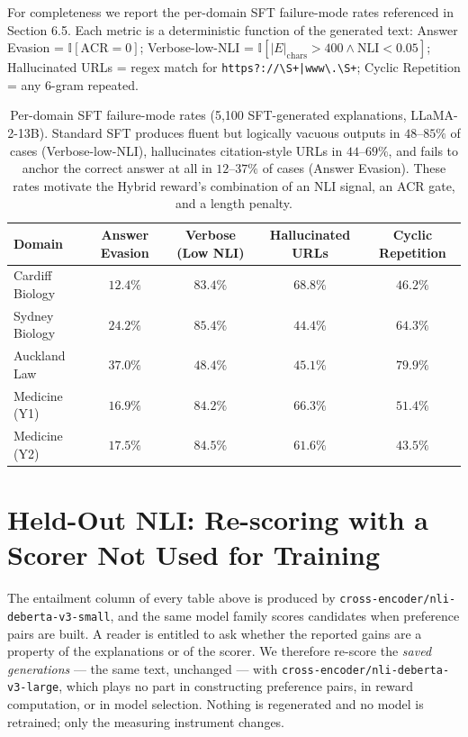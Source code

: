 For completeness we report the per-domain SFT failure-mode rates referenced in Section 6.5. Each metric is a deterministic function of the generated text: Answer Evasion = $\mathbb{I}[\mathrm{ACR}{=}0]$; Verbose-low-NLI = $\mathbb{I}[|E|_\text{chars}{>}400 \land \mathrm{NLI}{<}0.05]$; Hallucinated URLs = regex match for \texttt{https?://\textbackslash S+|www\textbackslash .\textbackslash S+}; Cyclic Repetition = any $6$-gram repeated.

\begin{table}[h]
\centering
\small
\begin{tabular}{l|c|c|c|c}
\toprule
Domain & Answer Evasion & Verbose (Low NLI) & Hallucinated URLs & Cyclic Repetition \\
\midrule
Cardiff Biology & $12.4\%$ & $83.4\%$ & $68.8\%$ & $46.2\%$ \\
Sydney Biology  & $24.2\%$ & $85.4\%$ & $44.4\%$ & $64.3\%$ \\
Auckland Law    & $37.0\%$ & $48.4\%$ & $45.1\%$ & $79.9\%$ \\
Medicine (Y1)   & $16.9\%$ & $84.2\%$ & $66.3\%$ & $51.4\%$ \\
Medicine (Y2)   & $17.5\%$ & $84.5\%$ & $61.6\%$ & $43.5\%$ \\
\bottomrule
\end{tabular}
\caption{Per-domain SFT failure-mode rates (5{,}100 SFT-generated explanations, LLaMA-2-13B). Standard SFT produces fluent but logically vacuous outputs in $48$--$85\%$ of cases (Verbose-low-NLI), hallucinates citation-style URLs in $44$--$69\%$, and fails to anchor the correct answer at all in $12$--$37\%$ of cases (Answer Evasion). These rates motivate the Hybrid reward's combination of an NLI signal, an ACR gate, and a length penalty.}
\label{tab:failure_modes}
\end{table}

\section{Held-Out NLI: Re-scoring with a Scorer Not Used for Training}
\label{sec:heldout_nli_appendix}

The entailment column of every table above is produced by
\texttt{cross-encoder/nli-deberta-v3-small}, and the same model family scores
candidates when preference pairs are built. A reader is entitled to ask
whether the reported gains are a property of the explanations or of the
scorer. We therefore re-score the \emph{saved generations} --- the same text,
unchanged --- with \texttt{cross-encoder/nli-deberta-v3-large}, which plays no
part in constructing preference pairs, in reward computation, or in model
selection. Nothing is regenerated and no model is retrained; only the
measuring instrument changes.

